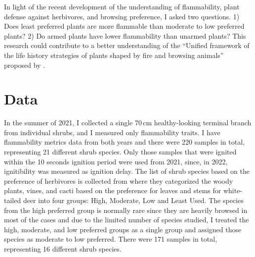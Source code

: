 \documentclass{ttuthes2007}
\begin{document}
In light of the recent development of the understanding of flammability, plant defense against herbivores, and browsing preference, I asked two questions. 1) Does least preferred plants are more flammable than moderate to low preferred plants?  2) Do armed plants have lower flammability than unarmed plants? This research could contribute to a better understanding of the ``Unified framework of the life history strategies of plants shaped by fire and browsing animals'' proposed by \citep{archibald2019unified}.


\section{Data}

In the summer of 2021, I collected a single 70\,cm healthy-looking terminal branch from individual shrubs, and I measured only flammability traits.  I have flammability metrics data from both years and there were 220 samples in total, representing 21 different shrub species. Only those samples that were ignited within the 10 seconds ignition period were used from 2021, since, in 2022, ignitibility was measured as ignition delay. The list of shrub species based on the preference of herbivores is collected from \citep{wright2003white} where they categorized the woody plants, vines, and cacti based on the preference for leaves and stems for white-tailed deer into four groups: High, Moderate, Low and Least Used. The species from the high preferred group is normally rare since they are heavily browsed in most of the cases and due to the limited number of species studied, I treated the high, moderate, and low preferred groups as a single group and assigned those species as moderate to low preferred. There were 171 samples in total, representing 16 different shrub species.\\

    
\end{document}
